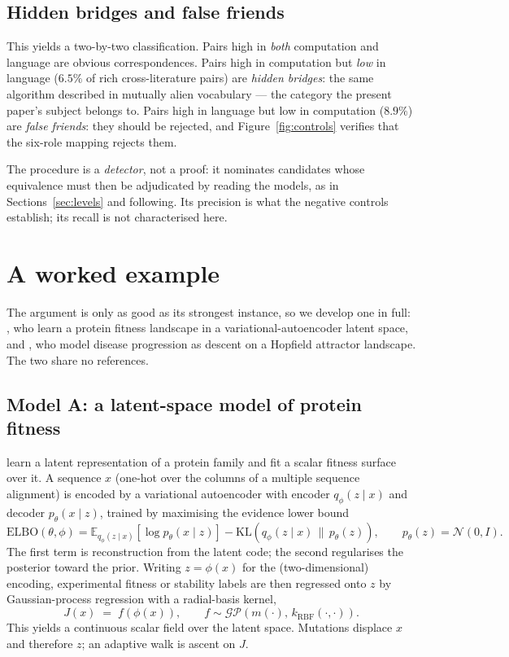 \documentclass[11pt]{article}
\begin{document}
\subsection{Hidden bridges and false friends}
This yields a two-by-two classification. Pairs high in \emph{both} computation and language are obvious
correspondences. Pairs high in computation but \emph{low} in language ($6.5\%$ of rich cross-literature pairs) are
\emph{hidden bridges}: the same algorithm described in mutually alien vocabulary --- the category the present paper's
subject belongs to. Pairs high in language but low in computation ($8.9\%$) are \emph{false friends}: they should be
rejected, and Figure~\ref{fig:controls} verifies that the six-role mapping rejects them.

The procedure is a \emph{detector}, not a proof: it nominates candidates whose equivalence must then be adjudicated
by reading the models, as in Sections~\ref{sec:levels} and following. Its precision is what the negative controls
establish; its recall is not characterised here.

\section{A worked example}
The argument is only as good as its strongest instance, so we develop one in full: \citet{ding2019latent}, who learn
a protein fitness landscape in a variational-autoencoder latent space, and \citet{fard2017attractor}, who model
disease progression as descent on a Hopfield attractor landscape. The two share no references.

\subsection{Model A: a latent-space model of protein fitness}
\citet{ding2019latent} learn a latent representation of a protein family and fit a scalar fitness surface over it.
A sequence $x$ (one-hot over the columns of a multiple sequence alignment) is encoded by a variational autoencoder
\citep{kingma2014vae} with encoder $q_\phi(z\mid x)$ and decoder $p_\theta(x\mid z)$, trained by maximising the
evidence lower bound
\begin{equation}
\mathrm{ELBO}(\theta,\phi)=\mathbb{E}_{q_\phi(z\mid x)}\!\left[\log p_\theta(x\mid z)\right]
-\mathrm{KL}\!\left(q_\phi(z\mid x)\,\|\,p_\theta(z)\right),
\qquad p_\theta(z)=\mathcal{N}(0,I).
\label{eq:elbo}
\end{equation}
The first term is reconstruction from the latent code; the second regularises the posterior toward the prior.
Writing $z=\phi(x)$ for the (two-dimensional) encoding, experimental fitness or stability labels are then regressed
onto $z$ by Gaussian-process regression \citep{rasmussen2006gp} with a radial-basis kernel,
\begin{equation}
J(x) \;=\; f\!\left(\phi(x)\right), \qquad f \sim \mathcal{GP}\!\left(m(\cdot),\,k_{\mathrm{RBF}}(\cdot,\cdot)\right).
\label{eq:gp}
\end{equation}
This yields a continuous scalar field over the latent space. Mutations displace $x$ and therefore $z$; an adaptive
walk is ascent on $J$.
\end{document}
